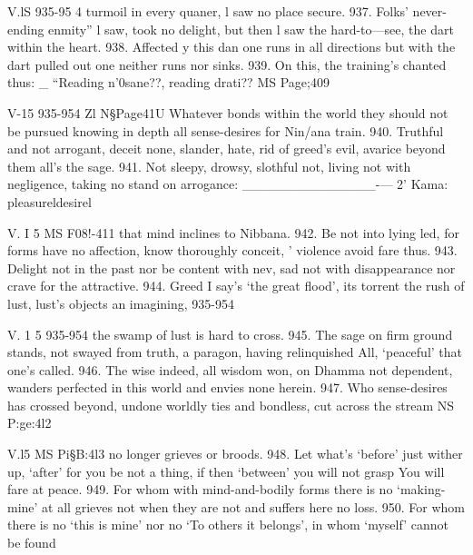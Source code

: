    
   
   V.lS
   935-95 4
   turmoil in every quaner,
   l saw no place secure.
   937.
   Folks' never-ending enmity”
   l saw, took no delight,
   but then l saw the hard-to—see,
   the dart within the heart.
   938.
   Affected y this dan
   one runs in all directions
   but with the dart pulled out
   one neither runs nor sinks.
   939.
   On this, the training's chanted thus:
    _
   “Reading n'0sane??, reading drati??
   MS Page;409
   
   
   
   V-15 935-954
   Zl
   N§Page41U
   Whatever bonds within the world
   they should not be pursued
   knowing in depth all sense-desires
   for Nin/ana train.
   940.
   Truthful and not arrogant,
   deceit none, slander, hate,
   rid of greed's evil, avarice
   beyond them all's the sage.
   941.
   Not sleepy, drowsy, slothful not,
   living not with negligence,
   taking no stand on arrogance:
   ______________-—
   2' Kama: pleasureldesirel
   
   
   
   V. I 5
   MS F08!-411
   that mind inclines to Nibbana.
   942.
   Be not into lying led,
   for forms have no affection,
   know thoroughly conceit, '
   violence avoid fare thus.
   943.
   Delight not in the past
   nor be content with nev\mess,
   sad not with disappearance
   nor crave for the attractive.
   944.
   Greed I say's `the great ﬂood',
   its torrent the rush of lust,
   lust's objects an imagining,
   935-954
   
   
   
   V. 1 5 935-954
   the swamp of lust is hard to cross.
   945.
   The sage on ﬁrm ground stands,
   not swayed from truth, a paragon,
   having relinquished All,
   `peaceful' that one's called.
   946.
   The wise indeed, all wisdom won,
   on Dhamma not dependent,
   wanders perfected in this world
   and envies none herein.
   947.
   Who sense-desires has crossed beyond,
   undone worldly ties
   and bondless, cut across the stream
   NS P:ge:4l2
   
   
   
   V.l5
   MS Pi§B:4l3
   no longer grieves or broods.
   948.
   Let what's `before' just wither up,
   `after' for you be not a thing,
   if then `between' you will not grasp
   You will fare at peace.
   949.
   For whom with mind-and-bodily forms
   there is no `making-mine' at all
   grieves not when they are not
   and suffers here no loss.
   950.
   For whom there is no `this is mine'
   nor no `To others it belongs',
   in whom `myself' cannot be found
   
